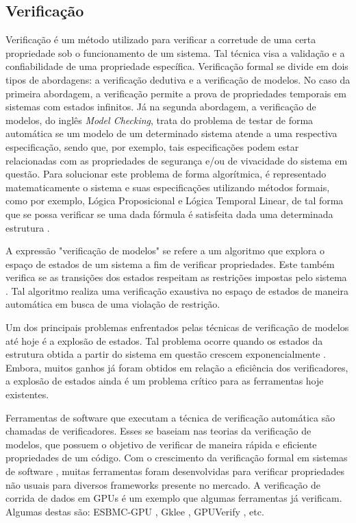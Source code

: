 \subsection{Verificação}
Verificação é um método utilizado para verificar a corretude de uma certa propriedade sob o funcionamento de um sistema. Tal técnica visa a validação e a confiabilidade de uma propriedade específica. Verificação formal se divide em dois tipos de abordagens: a verificação dedutiva e a verificação de modelos. No caso da primeira abordagem, a verificação permite a prova de propriedades temporais em sistemas com estados infinitos. Já na segunda abordagem, a verificação de modelos, do inglês \textit{Model Checking}, trata do problema de testar de forma automática se um modelo de um determinado sistema atende a uma respectiva especificação, sendo que, por exemplo, tais especificações podem estar relacionadas com as propriedades de segurança e/ou de vivacidade do sistema em questão. Para solucionar este problema de forma algorítmica, é representado matematicamente o sistema e suas especificações utilizando métodos formais, como por exemplo, Lógica Proposicional e Lógica Temporal Linear, de tal forma que se possa verificar se uma dada fórmula é satisfeita dada uma determinada estrutura \cite{jhala2009}.

A expressão "verificação de modelos"  se refere a um algoritmo que explora o espaço de estados de um sistema a fim de verificar propriedades. Este também verifica se as transições dos estados respeitam as restrições impostas pelo sistema \cite{clarke2001}.  Tal algoritmo realiza uma verificação exaustiva no espaço de estados de maneira automática em busca de uma violação de restrição.


Um dos principais problemas enfrentados pelas técnicas de verificação de modelos até hoje é a explosão de estados. Tal problema ocorre quando os estados da estrutura obtida a partir do sistema em questão crescem exponencialmente \cite{clarke2001}. Embora, muitos ganhos já foram obtidos em relação a eficiência dos verificadores, a explosão de estados ainda é um problema crítico para as ferramentas hoje existentes.


Ferramentas de software que executam a técnica de verificação automática são chamadas de verificadores. Esses se baseiam nas teorias da verificação de modelos, que possuem o objetivo de verificar de maneira rápida e eficiente propriedades de um código. Com o crescimento da verificação formal em sistemas de software , muitas ferramentas foram desenvolvidas para verificar propriedades não usuais para diversos frameworks presente no mercado. A verificação de corrida de dados em GPUs é um exemplo que algumas ferramentas já verificam. Algumas destas são: ESBMC-GPU \cite{monteiro2018}, Gklee \cite{gklee}, GPUVerify \cite{gpuverify}, etc. 



